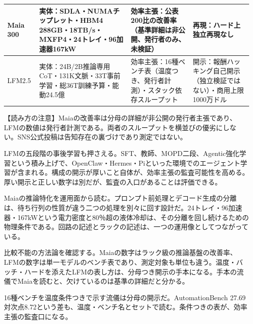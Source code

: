 \documentclass[lualatex,a4paper,10pt]{jlreq}
\begin{document}
\begin{strip} %
\centering\footnotesize
{}
\begin{tabularx}{0.96\linewidth}{@{}lXXX@{}}
\toprule
Maia 300 & 実体：SDLA・NUMAチップレット・HBM4 288GB・18TB/s・MXFP4・24トレイ・96加速器167kW & 効率主張：公表200比の改善率（基準詳細は非公開、発行者のみ、未検証） & 再現：ハード上独立再現なし \cite{B09,B66,B10,B67} \\
\midrule
LFM2.5 & 実体：24B/2B推論専用CoT・131K文脈・33T事前学習・総36T訓練予算・能動24.5億 & 効率主張：16種ベンチ表（温度つき、発行者計測）・スタック依存スループット & 開示：報酬ハッキング自己開示（独立検証ではない）・商用上限1000万ドル \cite{B11,B69,B12} \\
\bottomrule
\end{tabularx}
\end{strip} %

\begin{tcolorbox}[colback=SurveySoft,colframe=SurveyRule,arc=1mm,boxrule=0.4pt,left=2mm,right=2mm]
【読み方の注意】Maiaの改善率は分母の詳細が非公開の発行者主張であり、LFMの数値は発行者計測である。両者のスループットを横並びの優劣にしない。SNS公式投稿は告知存在の裏づけであり測定ではない。
\end{tcolorbox}
\cite{B09,B66,B10,B67,B68,B11,B69,B12}

LFMの五段階の事後学習も押さえる。SFT、教師、MOPD二段、Agentic強化学習という積み上げで、OpenClaw・Hermes・Piといった環境でのエージェント学習が含まれる。構成の開示が厚いこと自体が、効率主張の監査可能性を高める。厚い開示と正しい数字は別だが、監査の入口があることは評価できる。
\cite{B11,B69,B12}


Maiaの推論特化を運用面から読む。プロンプト前処理とデコード生成の分離は、待ち行列の性質が違う二つの処理を別々に回す設計だ。24トレイ・96加速器・167kWという電力密度と80％超の液体冷却は、その分離を回し続けるための物理条件である。回路の記述とラックの記述は、一つの運用像としてつながっている。
\cite{B09,B66,B10,B67,B68}


比較不能の方法論を確認する。Maiaの数字はラック級の推論基盤の改善率、LFMの数字は単一モデルのベンチ表であり、測定対象も単位も違う。温度・バッチ・ハードを添えたLFMの表し方は、分母つき開示の手本になる。手本の流儀でMaiaを読むと、欠けているのは基準の詳細だと分かる。
\cite{B09,B66,B10,B67,B68,B11,B69,B12}


16種ベンチを温度条件つきで示す流儀は分母の開示だ。AutomationBench 27.69対次点8.72という差も、温度・ベンチ名とセットで読む。条件つきの表が、効率主張の監査口になる。
\cite{B11,B69,B12}
\end{document}
